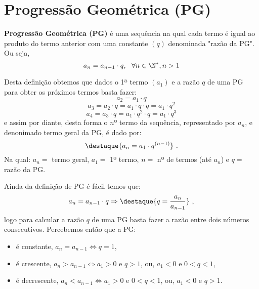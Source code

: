  

\section{Progressão Geométrica (PG)}

 \colorbox{azul}{
 \begin{minipage}{14.5cm}
 \begin{center}
  \textbf{Progressão Geométrica (PG)} é uma sequência na qual cada termo é igual ao produto do termo anterior com uma constante $(q)$ denominada "razão da PG". Ou seja,
  \[a_{n}= a_{n-1} \cdot q, \ \ \forall n \in \N^{\ast}, n > 1\]
 \end{center}
 \end{minipage}}
 \vskip0.3cm
 
 Desta definição obtemos que dados o 1ª termo $(a_1)$ e a razão $q$ de uma PG para obter os próximos termos basta fazer:
 \[a_2= a_1 \cdot q\]
 \[a_3= a_2 \cdot q= a_1 \cdot q \cdot q= a_1 \cdot q^2\]
 \[a_4= a_3 \cdot q= a_1 \cdot q^2 \cdot q= a_1 \cdot q^3 \]
 e assim por diante, desta forma o $nº$ termo da sequência, representado por $a_n$, e denonimado termo geral da PG, é dado por:
 \[\destaque{a_n= a_1 \cdot q^{(n-1)}} \ .\]
 Na qual: $a_n=$ termo geral, $a_1=$ 1º termo, $n=$ nº de termos (até $a_n$) e $q=$ razão da PG.
 
 Ainda da definição de PG é fácil temos que:
 \[a_{n}= a_{n-1} \cdot q \Rightarrow
 \destaque{q= \frac{a_{n}}{ a_{n-1}}} \ ,\]
 logo para calcular a razão $q$ de uma PG basta fazer a razão entre dois números consecutivos. Percebemos então que a PG:
 \begin{itemize}
  \item é constante, $a_n= a_{n-1} \Leftrightarrow q= 1$, 
  \item é crescente, $a_n > a_{n-1} \Leftrightarrow a_1 > 0$ e $q > 1$, ou, $a_1 < 0$ e $0 < q < 1$,
  \item é decrescente, $a_n < a_{n-1} \Leftrightarrow a_1 > 0$ e $0 < q < 1$, ou, $a_1 < 0$ e $q > 1$.
 \end{itemize}
 
